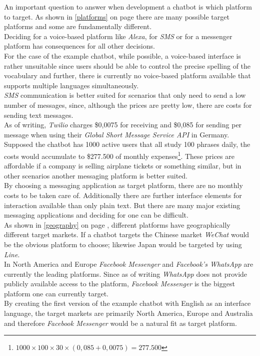 An important question to answer when development a chatbot is which platform to target.
As shown in \ref{platforms} on page \pageref{platforms} there are many possible target platforms
and some are fundamentally different.
\\

Deciding for a voice-based platform like \emph{Alexa}, for \emph{SMS} or for a messenger platform has consequences
for all other decisions.
\\
For the case of the example chatbot, while possible, a voice-based interface is rather unsuitable since
users should be able to control the precise spelling of the vocabulary
and further, there is currently no voice-based platform available
that supports multiple languages simultaneously.
\\

\emph{SMS} communication is better suited for scenarios that only need to send a low number of messages,
since, although the prices are pretty low, there are costs for sending text messages.
\\
As of writing, \emph{Twilio} charges \$0,0075 for receiving and \$0,085 for sending per message when using their \emph{Global Short Message Service API} in Germany\cite{twilio}.
\\
Supposed the chatbot has 1000 active users that all study 100 phrases daily,
the costs would accumulate to \$277.500 of monthly expenses\footnote{$1000\times100\times30\times(0,085+0,0075)=277.500$}.
These prices are affordable if a company is selling airplane tickets or something similar,
but in other scenarios another messaging platform is better suited.
\\

By choosing a messaging application as target platform, there are no monthly costs to be taken care of.
Additionally there are further interface elements for interaction available than only plain text.
But there are many major existing messaging applications and deciding for one can be difficult.
\\
As shown in \ref{geography} on page \pageref{geography}, different platforms have geographically different target markets.
If a chatbot targets the Chinese market \emph{WeChat} would be the obvious platform to choose;
likewise Japan would be targeted by using\emph{ Line}.
\\
In North America and Europe \emph{Facebook Messenger} and \emph{Facebook's WhatsApp} are currently the leading platforms.
Since as of writing \emph{WhatsApp} does not provide publicly available access to the platform,
\emph{Facebook Messenger} is the biggest platform one can currently target.
\\
By creating the first version of the example chatbot with English as an interface language,
the target markets are primarily North America, Europe and Australia and therefore \emph{Facebook Messenger} would be a natural fit as target platform.
\\

